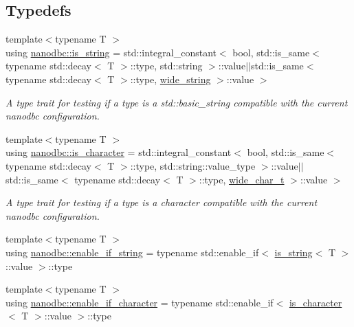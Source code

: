 \subsection*{Typedefs}
\begin{DoxyCompactItemize}
\item 
{\footnotesize template$<$typename T $>$ }\\using \mbox{\hyperlink{group__utility_gaac06d237b348a3040a5cb378e86af570}{nanodbc\+::is\+\_\+string}} = std\+::integral\+\_\+constant$<$ bool, std\+::is\+\_\+same$<$ typename std\+::decay$<$ T $>$\+::type, std\+::string $>$\+::value$\vert$$\vert$std\+::is\+\_\+same$<$ typename std\+::decay$<$ T $>$\+::type, \mbox{\hyperlink{namespacenanodbc_aeddf33f0df2bb9ba05323112e3aed316}{wide\+\_\+string}} $>$\+::value $>$
\begin{DoxyCompactList}\small\item\em A type trait for testing if a type is a std\+::basic\+\_\+string compatible with the current nanodbc configuration. \end{DoxyCompactList}\item 
{\footnotesize template$<$typename T $>$ }\\using \mbox{\hyperlink{group__utility_gadf207d0dda8d44076925a9d19fbfac0a}{nanodbc\+::is\+\_\+character}} = std\+::integral\+\_\+constant$<$ bool, std\+::is\+\_\+same$<$ typename std\+::decay$<$ T $>$\+::type, std\+::string\+::value\+\_\+type $>$\+::value$\vert$$\vert$std\+::is\+\_\+same$<$ typename std\+::decay$<$ T $>$\+::type, \mbox{\hyperlink{namespacenanodbc_ad2d466f268b27c7f76a801379dbeb101}{wide\+\_\+char\+\_\+t}} $>$\+::value $>$
\begin{DoxyCompactList}\small\item\em A type trait for testing if a type is a character compatible with the current nanodbc configuration. \end{DoxyCompactList}\item 
{\footnotesize template$<$typename T $>$ }\\using \mbox{\hyperlink{group__utility_ga0cf23526593c5647433a3dbdf7f582e3}{nanodbc\+::enable\+\_\+if\+\_\+string}} = typename std\+::enable\+\_\+if$<$ \mbox{\hyperlink{group__utility_gaac06d237b348a3040a5cb378e86af570}{is\+\_\+string}}$<$ T $>$\+::value $>$\+::type
\item 
{\footnotesize template$<$typename T $>$ }\\using \mbox{\hyperlink{group__utility_ga4de8f00ef2dfc16187ee819e4ff75602}{nanodbc\+::enable\+\_\+if\+\_\+character}} = typename std\+::enable\+\_\+if$<$ \mbox{\hyperlink{group__utility_gadf207d0dda8d44076925a9d19fbfac0a}{is\+\_\+character}}$<$ T $>$\+::value $>$\+::type
\end{DoxyCompactItemize}


